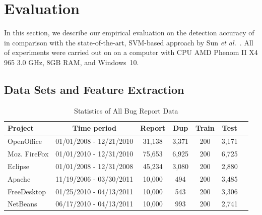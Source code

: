 \section{Evaluation}
\label{eval}

In this section, we describe our empirical evaluation on the detection
accuracy of {\model} in comparison with the state-of-the-art,
SVM-based approach by Sun {\em et al.}~\cite{davidlo10}. All of
experiments were carried out on on a computer with CPU AMD Phenom II
X4 965 3.0 GHz, 8GB RAM, and Windows~10.


\subsection{Data Sets and Feature Extraction}


\begin{table}[t]
\addtolength{\tabcolsep}{-3pt}
\centering
\small
\caption{Statistics of All Bug Report Data}
    \begin{tabular}{lcccccc}
    \hline
    Project &  Time period &  Report &  Dup  & Train & Test \\
    \hline
    OpenOffice & 01/01/2008 - 12/21/2010 & 31,138 & 3,371 & 200 & 3,171  \\
    Moz. FireFox &  01/01/2010 - 12/31/2010 & 75,653 & 6,925 & 200 & 6,725 \\
    Eclipse  &  01/01/2008 - 12/31/2008 & 45,234 & 3,080 & 200 & 2,880  \\
    \hline
    Apache  &  11/19/2006 - 03/30/2011 & 10,000 & 494   & 200 & 3,485 \\
    FreeDesktop &  01/25/2010 - 04/13/2011 & 10,000 & 543   & 200 & 3,306 \\
    NetBeans    & 06/17/2010 - 04/13/2011 & 10,000 & 993 & 200 & 2,741\\
    \hline
    \end{tabular}
\label{data}
\end{table}

